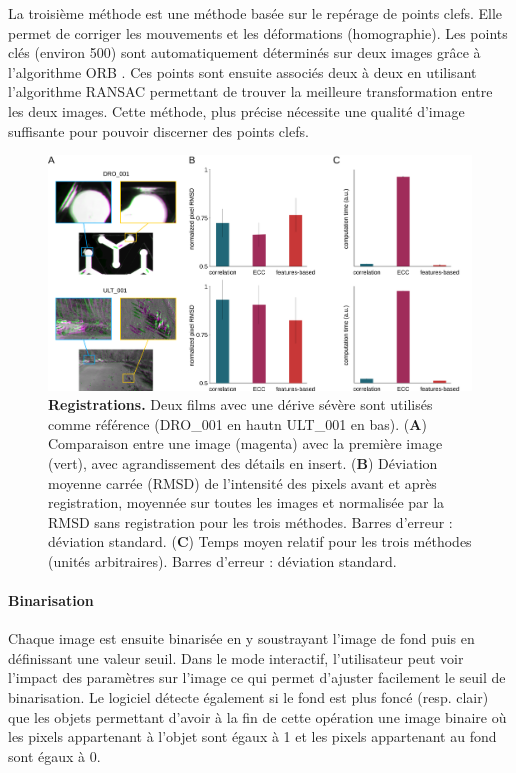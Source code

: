		La troisième méthode est une méthode basée sur le repérage de points clefs. Elle permet de corriger les mouvements et les déformations (homographie). Les points clés (environ 500) sont automatiquement déterminés sur deux images grâce à l'algorithme ORB \cite{}. Ces points sont ensuite associés deux à deux en utilisant l’algorithme RANSAC \cite{} permettant de trouver la meilleure transformation entre les deux images. Cette méthode, plus précise nécessite une qualité d'image suffisante pour pouvoir discerner des points clefs.
		
	\begin{figure}[h]
    \centering
    \includegraphics[width=1\textwidth]{part_1/assets/Figure_2.png}    
    \caption{\textbf{Registrations.} Deux films avec une dérive sévère sont utilisés comme référence (DRO\_001 en hautn ULT\_001 en bas). (\textbf{A}) Comparaison entre une image (magenta) avec la première image (vert), avec agrandissement des détails en insert. (\textbf{B}) Déviation moyenne carrée (RMSD) de l'intensité des pixels avant et après registration, moyennée sur toutes les images et normalisée par la RMSD sans registration pour les trois méthodes. Barres d'erreur : déviation standard. (\textbf{C}) Temps moyen relatif pour les trois méthodes (unités arbitraires). Barres d'erreur : déviation standard.}
    \label{part_1:fig_2}
    \end{figure}
		
		
		\paragraph{Binarisation}
		Chaque image est ensuite binarisée  en y soustrayant l'image de fond puis en définissant une valeur seuil. Dans le mode interactif, l'utilisateur peut voir l'impact des paramètres sur l'image ce qui permet d'ajuster facilement le seuil de binarisation. Le logiciel détecte également si le fond est plus foncé (resp. clair) que les objets permettant d'avoir à la fin de cette opération une image binaire  où les pixels appartenant à l’objet sont égaux à 1 et les pixels appartenant au fond sont égaux à 0.
		
